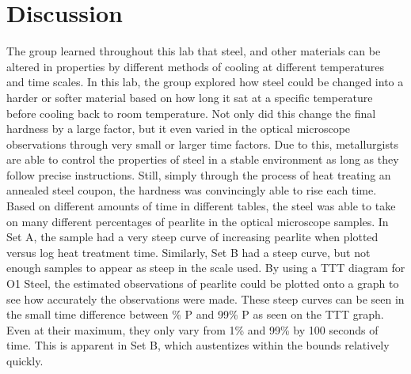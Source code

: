 \documentclass{article}
\begin{document}
\section{Discussion}
The group learned throughout this lab that steel, and other materials can be altered in properties by different methods of cooling at different temperatures and time scales. In this lab, the group explored how steel could be changed into a harder or softer material based on how long it sat at a specific temperature before cooling back to room temperature. Not only did this change the final hardness by a large factor, but it even varied in the optical microscope observations through very small or larger time factors. Due to this, metallurgists are able to control the properties of steel in a stable environment as long as they follow precise instructions.
	Still, simply through the process of heat treating an annealed steel coupon, the hardness was convincingly able to rise each time. Based on different amounts of time in different tables, the steel was able to take on many different percentages of pearlite in the optical microscope samples. In Set A, the sample had a very steep curve of increasing pearlite when plotted versus log heat treatment time. Similarly, Set B had a steep curve, but not enough samples to appear as steep in the scale used. By using a TTT diagram for O1 Steel, the estimated observations of pearlite could be plotted onto a graph to see how accurately the observations were made. These steep curves can be seen in the small time difference between \% P and 99\% P as seen on the TTT graph. Even at their maximum, they only vary from 1\% and 99\% by 100 seconds of time. This is apparent in Set B, which austentizes within the bounds relatively quickly.
\end{document}
